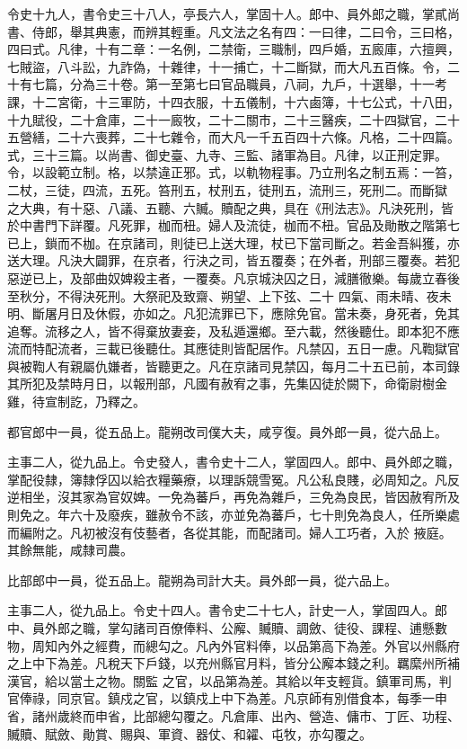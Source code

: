\begin{pinyinscope}
 令史十九人，書令史三十八人，亭長六人，掌固十人。郎中、員外郎之職，掌貳尚書、侍郎，舉其典憲，而辨其輕重。凡文法之名有四：一曰律，二曰令，三曰格，四曰式。凡律，十有二章：一名例，二禁衛，三職制，四戶婚，五廄庫，六擅興，七賊盜，八斗訟，九詐偽，十雜律，十一捕亡，十二斷獄，而大凡五百條。令，二十有七篇，分為三十卷。第一至第七曰官品職員，八祠，九戶，十選舉，十一考
 課，十二宮衛，十三軍防，十四衣服，十五儀制，十六鹵簿，十七公式，十八田，十九賦役，二十倉庫，二十一廄牧，二十二關市，二十三醫疾，二十四獄官，二十五營繕，二十六喪葬，二十七雜令，而大凡一千五百四十六條。凡格，二十四篇。式，三十三篇。以尚書、御史臺、九寺、三監、諸軍為目。凡律，以正刑定罪。令，以設範立制。格，以禁違正邪。式，以軌物程事。乃立刑名之制五焉：一笞，二杖，三徒，四流，五死。笞刑五，杖刑五，徒刑五，流刑三，死刑二。而斷獄
 之大典，有十惡、八議、五聽、六贓。贖配之典，具在《刑法志》。凡決死刑，皆於中書門下詳覆。凡死罪，枷而杻。婦人及流徒，枷而不杻。官品及勛散之階第七已上，鎖而不枷。在京諸司，則徒已上送大理，杖已下當司斷之。若金吾糾獲，亦送大理。凡決大闢罪，在京者，行決之司，皆五覆奏；在外者，刑部三覆奏。若犯惡逆已上，及部曲奴婢殺主者，一覆奏。凡京城決囚之日，減膳徹樂。每歲立春後至秋分，不得決死刑。大祭祀及致齋、朔望、上下弦、二十
 四氣、雨未晴、夜未明、斷屠月日及休假，亦如之。凡犯流罪已下，應除免官。當未奏，身死者，免其追奪。流移之人，皆不得棄放妻妾，及私遁還鄉。至六載，然後聽仕。即本犯不應流而特配流者，三載已後聽仕。其應徒則皆配居作。凡禁囚，五日一慮。凡鞫獄官與被鞫人有親屬仇嫌者，皆聽更之。凡在京諸司見禁囚，每月二十五已前，本司錄其所犯及禁時月日，以報刑部，凡國有赦宥之事，先集囚徒於闕下，命衛尉樹金雞，待宣制訖，乃釋之。



 都官郎中一員，從五品上。龍朔改司僕大夫，咸亨復。員外郎一員，從六品上。



 主事二人，從九品上。令史發人，書令史十二人，掌固四人。郎中、員外郎之職，掌配役隸，簿隸俘囚以給衣糧藥療，以理訴競雪冤。凡公私良賤，必周知之。凡反逆相坐，沒其家為官奴婢。一免為蕃戶，再免為雜戶，三免為良民，皆因赦宥所及則免之。年六十及廢疾，雖赦令不該，亦並免為蕃戶，七十則免為良人，任所樂處而編附之。凡初被沒有伎藝者，各從其能，而配諸司。婦人工巧者，入於
 掖庭。其餘無能，咸隸司農。



 比部郎中一員，從五品上。龍朔為司計大夫。員外郎一員，從六品上。



 主事二人，從九品上。令史十四人。書令史二十七人，計史一人，掌固四人。郎中、員外郎之職，掌勾諸司百僚俸料、公廨、贓贖、調斂、徒役、課程、逋懸數物，周知內外之經費，而總勾之。凡內外官料俸，以品第高下為差。外官以州縣府之上中下為差。凡稅天下戶錢，以充州縣官月料，皆分公廨本錢之利。羈縻州所補漢官，給以當土之物。關監
 之官，以品第為差。其給以年支輕貨。鎮軍司馬，判官俸祿，同京官。鎮戍之官，以鎮戍上中下為差。凡京師有別借食本，每季一申省，諸州歲終而申省，比部總勾覆之。凡倉庫、出內、營造、傭市、丁匠、功程、贓贖、賦斂、勛賞、賜與、軍資、器仗、和糴、屯牧，亦勾覆之。




\end{pinyinscope}
